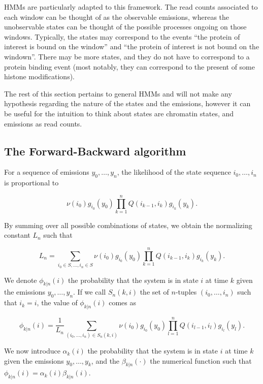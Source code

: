 \documentclass[12pt]{article}
\begin{document}
\begin{appendices}
    HMMs are particularly adapted to this framework. The read counts
    associated to each window can be thought of as the observable
    emissions, whereas the unobservable states can be thought of
    the possible processes ongoing on those windows. Typically, the
    states may correspond to the events ``the protein of interest
    is bound on the window'' and ``the protein of interest is not
    bound on the windown''. There may be more states, and they do
    not have to correspond to a protein binding event (most notably,
    they can correspond to the present of some histone modifications).

    The rest of this section pertains to general HMMs and will not
    make any hypothesis regarding the nature of the states and the
    emissions, however it can be useful for the intuition to think
    about states are chromatin states, and emissions as read counts.

\subsection{The Forward-Backward algorithm}

    For a sequence of emissions $y_0, \ldots, y_n$, the likelihood
    of the state sequence $i_0, \ldots, i_n$ is proportional to

    $$ \nu(i_0)g_{i_0}(y_0)
       \prod_{k=1}^n Q(i_{k-1},i_k)g_{i_k}(y_k). $$

    By summing over all possible combinations of states, we obtain
    the normalizing constant $L_n$ such that

    \begin{equation}
       L_n = \sum_{i_0 \in S, \ldots, i_n \in S} \nu(i_0)g_{i_0}(y_0)
       \prod_{k=1}^n Q(i_{k-1},i_k)g_{i_k}(y_k).
    \end{equation}

    We denote $\phi_{k|n}(i)$ the probability that the system is in
    state $i$ at time $k$ given the emissions $y_0, \ldots, y_n$. If
    we call $S_n(k,i)$ the set of $n$-tuples $(i_0, \ldots, i_n)$
    such that $i_k = i$, the value of $\phi_{k|n}(i)$ comes as

    $$ \phi_{k|n}(i) = \frac{1}{L_n}
       \sum_{(i_0, \ldots, i_n) \in S_n(k,i)}
       \nu(i_0)g_{i_0}(y_0) \prod_{l=1}^n Q(i_{l-1}, i_l)
       g_{i_l}(y_l). $$

    We now introduce $\alpha_k(i)$ the probability that the
    system is in state $i$ at time $k$ given the emissions
    $y_0, \ldots, y_k$, and the $\beta_{k|n}(\cdot)$ the numerical
    function such that $\phi_{k|n}(i) = \alpha_k(i)\beta_{k|n}(i)$.


\end{appendices}
\end{document}
